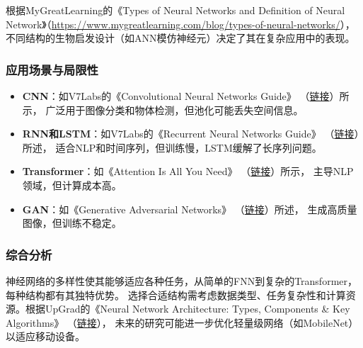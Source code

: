 \documentclass[UTF8]{report}
\theoremstyle{MyLineTheoremStyle} %
\theoremstyle{MyBlockTheoremStyle} %
\theoremstyle{MySubsubsectionStyle} %
\begin{document}
根据MyGreatLearning的《Types of Neural Networks and Definition of Neural Network》（\url{https://www.mygreatlearning.com/blog/types-of-neural-networks/}），不同结构的生物启发设计（如ANN模仿神经元）决定了其在复杂应用中的表现。

\subsubsection{应用场景与局限性}
\begin{itemize}
    \item \textbf{CNN}：如V7Labs的《Convolutional Neural Networks Guide》
          （\href{https://www.v7labs.com/blog/convolutional-neural-networks-guide/}{链接}）所示，
          广泛用于图像分类和物体检测，但池化可能丢失空间信息。
    \item \textbf{RNN和LSTM}：如V7Labs的《Recurrent Neural Networks Guide》
          （\href{https://www.v7labs.com/blog/recurrent-neural-networks-guide/}{链接}）所述，
          适合NLP和时间序列，但训练慢，LSTM缓解了长序列问题。
    \item \textbf{Transformer}：如《Attention Is All You Need》
          （\href{https://arxiv.org/abs/1706.03762}{链接}）所示，
          主导NLP领域，但计算成本高。
    \item \textbf{GAN}：如《Generative Adversarial Networks》
          （\href{https://papers.nips.cc/paper/5423-generative-adversarial-nets.pdf}{链接}）所述，
          生成高质量图像，但训练不稳定。
\end{itemize}

\subsubsection{综合分析}
神经网络的多样性使其能够适应各种任务，从简单的FNN到复杂的Transformer，每种结构都有其独特优势。
选择合适结构需考虑数据类型、任务复杂性和计算资源。根据UpGrad的《Neural Network Architecture: 
Types, Components \& Key Algorithms》
（\href{https://www.upgrad.com/blog/neural-network-architecture-components-algorithms/}{链接}），
未来的研究可能进一步优化轻量级网络（如MobileNet）以适应移动设备。
\end{document}
